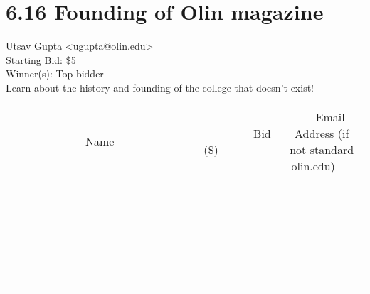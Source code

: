 \documentclass[11pt]{article}
\begin{document}
					\section*{6.16 Founding of Olin magazine}
					Utsav Gupta <ugupta@olin.edu> \\
					Starting Bid: \$5 \\
					Winner(s): Top bidder \\
					Learn about the history and founding of the college that doesn't exist! \\
					[6ex]
					\begin{tabular}{c c c}
						~~~~~~~~~~~~~Name~~~~~~~~~~~~~ & ~~~~~~~~~Bid (\$)~~~~~~~~~ & ~~~Email Address (if not standard olin.edu)~~~ \\
				
 & & \\
\hline
 & & \\
\hline
 & & \\
\hline
 & & \\
\hline
 & & \\
\hline
 & & \\
\hline
 & & \\
\hline
 & & \\
\hline
 & & \\
\hline
 & & \\
\hline
 & & \\
\hline
 & & \\
\hline
 & & \\
\hline
 & & \\
\hline
 & & \\
\hline
 & & \\
\hline
 & & \\
\hline
 & & \\
\hline
 & & \\
\hline
 & & \\
\hline
 & & \\
\hline
 & & \\
\hline
 & & \\
\hline
 & & \\
\hline
 & & \\
\hline
 & & \\
\hline
					\end{tabular}
					\clearpage
				
\end{document}
